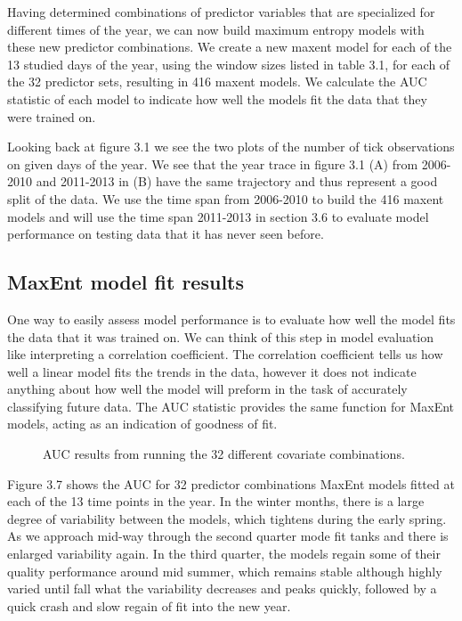 Having determined combinations of predictor variables that are specialized for different times of the year, we can now build maximum entropy models with these new predictor combinations. We create a new maxent model for each of the 13 studied days of the year, using the window sizes listed in table 3.1, for each of the 32 predictor sets, resulting in 416 maxent models. We calculate the AUC statistic of each model to indicate how well the models fit the data that they were trained on. \newline

\noindent Looking back at figure 3.1 we see the two plots of the number of tick observations on given days of the year. We see that the year trace in figure 3.1 (A)  from 2006-2010 and 2011-2013 in (B) have the same trajectory and thus represent a good split of the data. We use the time span from 2006-2010 to build the 416 maxent models and will use the time span 2011-2013 in section 3.6 to evaluate model performance on testing data that it has never seen before. \newline

\subsection{ MaxEnt model fit results}

One way to easily assess model performance is to evaluate how well the model fits the data that it was trained on. We can think of this step in model evaluation like interpreting a correlation coefficient. The correlation coefficient tells us how well a linear model fits the trends in the data, however it does not indicate anything about how well the model will preform in the task of accurately classifying future data. The AUC statistic provides the same function for MaxEnt models, acting as an indication of goodness of fit. \newline

\begin{figure} [!ht]
\centerline{}
\caption{AUC results from running the 32 different covariate combinations. }
\label{fig6}
\end{figure}


\noindent Figure 3.7 shows the AUC for 32 predictor combinations MaxEnt models fitted at each of the 13 time points in the year. In the winter months, there is a large degree of variability between the models, which tightens during the early spring. As we approach mid-way through the second quarter mode fit tanks and there is enlarged variability again. In the third quarter, the models regain some of their quality performance around mid summer, which remains stable although highly varied until fall what the variability decreases and peaks quickly, followed by a quick crash and slow regain of fit into the new year. 


